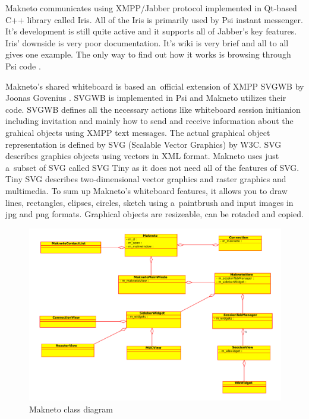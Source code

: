 Makneto communicates using XMPP/Jabber protocol implemented in Qt-based C++ library called Iris. All of the Iris is primarily used by Psi instant messenger. It's development is still quite active and it supports all of Jabber's key features. Iris' downside is very poor documentation. It's wiki is very brief and all to all gives one example. The only way to find out how it works is browsing through Psi code \cite{irisWiki}.

Makneto's shared whiteboard is based an~official extension of XMPP SVGWB by Joonas Govenius \cite{SVGWB}. SVGWB is implemented in Psi and Makneto utilizes their code. SVGWB defines all the necessary actions like whiteboard session initianion including invitation and mainly how to send and receive information about the grahical objects using XMPP text messages. The actual graphical object representation is defined by SVG \cite{SVG}(Scalable Vector Graphics) by W3C. SVG describes graphics objects using vectors in XML format. Makneto uses just a~subset of SVG called SVG Tiny \cite{SVGtiny} as it does not need all of the features of SVG. Tiny SVG describes two-dimensional vector graphics and raster graphics and multimedia. To sum up Makneto's whiteboard features, it allows you to draw lines, rectangles, elipses, circles, sketch using a~paintbrush and input images in jpg and png formats. Graphical objects are resizeable, can be rotaded and copied.  

\begin{figure}[ht]
\begin{center}
	\includegraphics[width=15cm]{fig/makneto-orig-class-diagram.pdf}
	\caption{Makneto class diagram}
	\label{fig:makneto-original-class-diagram}
\end{center}
\end{figure}

